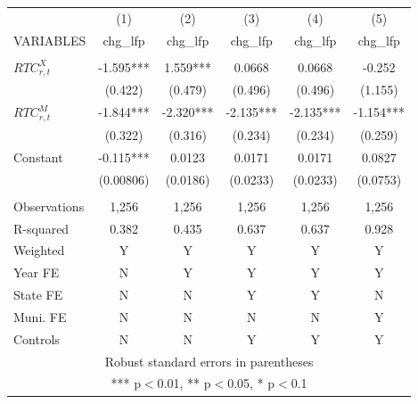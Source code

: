 \begin{tabular}{lccccc} \hline
 & (1) & (2) & (3) & (4) & (5) \\
VARIABLES & chg\_lfp & chg\_lfp & chg\_lfp & chg\_lfp & chg\_lfp \\ \hline
 &  &  &  &  &  \\
$ RTC_{r,t}^X$ & -1.595*** & 1.559*** & 0.0668 & 0.0668 & -0.252 \\
 & (0.422) & (0.479) & (0.496) & (0.496) & (1.155) \\
$ RTC_{r,t}^M$ & -1.844*** & -2.320*** & -2.135*** & -2.135*** & -1.154*** \\
 & (0.322) & (0.316) & (0.234) & (0.234) & (0.259) \\
Constant & -0.115*** & 0.0123 & 0.0171 & 0.0171 & 0.0827 \\
 & (0.00806) & (0.0186) & (0.0233) & (0.0233) & (0.0753) \\
 &  &  &  &  &  \\
Observations & 1,256 & 1,256 & 1,256 & 1,256 & 1,256 \\
R-squared & 0.382 & 0.435 & 0.637 & 0.637 & 0.928 \\
Weighted & Y & Y & Y & Y & Y \\
Year FE & N & Y & Y & Y & Y \\
State FE & N & N & Y & Y & N \\
Muni. FE & N & N & N & N & Y \\
 Controls & N & N & Y & Y & Y \\ \hline
\multicolumn{6}{c}{ Robust standard errors in parentheses} \\
\multicolumn{6}{c}{ *** p$<$0.01, ** p$<$0.05, * p$<$0.1} \\
\end{tabular}
